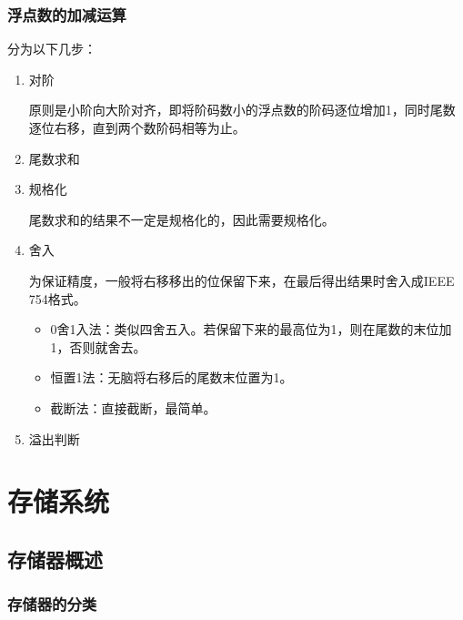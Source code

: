 \documentclass[12pt, a4paper, oneside]{ctexart}
\begin{document}
\subsubsection{浮点数的加减运算}

分为以下几步：
\begin{enumerate}
  \item {\kaishu 对阶}
  
  原则是小阶向大阶对齐，即将阶码数小的浮点数的阶码逐位增加1，同时尾数逐位右移，直到两个数阶码相等为止。
  \item {\kaishu 尾数求和}
  \item {\kaishu 规格化}
  
  尾数求和的结果不一定是规格化的，因此需要规格化。
  \item {\kaishu 舍入}
  
  为保证精度，一般将右移移出的位保留下来，在最后得出结果时舍入成IEEE 754格式。
  \begin{itemize}
    \item 0舍1入法：类似四舍五入。若保留下来的最高位为1，则在尾数的末位加1，否则就舍去。
    \item 恒置1法：无脑将右移后的尾数末位置为1。
    \item 截断法：直接截断，最简单。
  \end{itemize}
  \item {\kaishu 溢出判断}
\end{enumerate}

\section{存储系统}

\subsection{存储器概述}

\subsubsection{存储器的分类}
\end{document}
